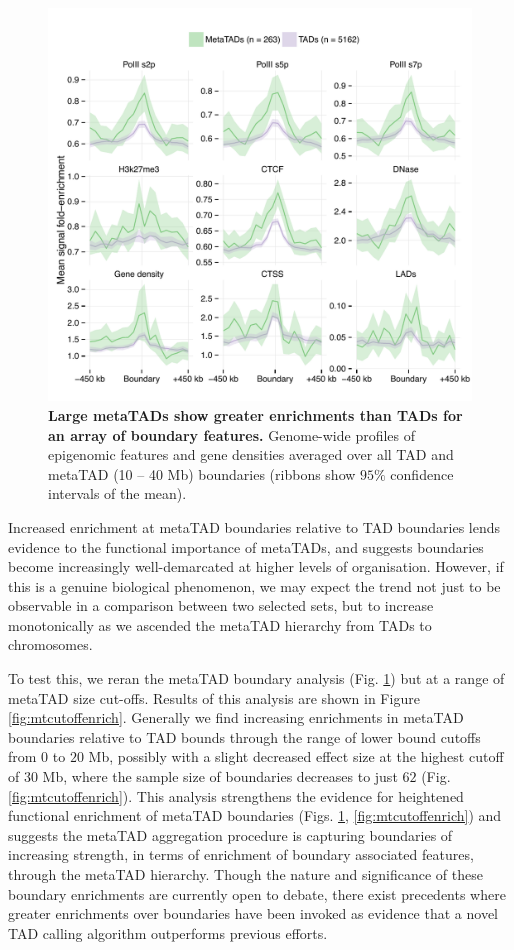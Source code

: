 \documentclass[a4paper,11pt,oneside]{book}
\begin{document}
\begin{figure}
\begin{center} 
\includegraphics[width=4.5in]{figs/mt_feats.pdf}
\captionsetup{width=\textwidth}
\caption[Large metaTADs show greater enrichments than TADs for an array of boundary features.]{ {\bf Large metaTADs show greater enrichments than TADs for an array of boundary features.}
Genome-wide profiles of epigenomic features and gene densities averaged over all TAD and metaTAD (10 -- 40 Mb) boundaries (ribbons show $95\%$ confidence intervals of the mean).
}\label{fig:mtfeats}
\end{center}
\end{figure} 

Increased enrichment at metaTAD boundaries relative to TAD boundaries lends evidence to the functional importance of metaTADs, and suggests boundaries become increasingly well-demarcated at higher levels of organisation. However, if this is a genuine biological phenomenon, we may expect the trend not just to be observable in a comparison between two selected sets, but to increase monotonically as we ascended the metaTAD hierarchy from TADs to chromosomes.

To test this, we reran the metaTAD boundary analysis (Fig. \ref{fig:mtfeats}) but at a range of metaTAD size cut-offs. Results of this analysis are shown in Figure \ref{fig:mtcutoffenrich}. Generally we find increasing enrichments in metaTAD boundaries relative to TAD bounds through the range of lower bound cutoffs from $0$ to $20$ Mb, possibly with a slight decreased effect size at the highest cutoff of $30$ Mb, where the sample size of boundaries decreases to just $62$ (Fig. \ref{fig:mtcutoffenrich}). This analysis strengthens the evidence for heightened functional enrichment of metaTAD boundaries (Figs. \ref{fig:mtfeats}, \ref{fig:mtcutoffenrich}) and suggests the metaTAD aggregation procedure is capturing boundaries of increasing strength, in terms of enrichment of boundary associated features, through the metaTAD hierarchy. Though the nature and significance of these boundary enrichments are currently open to debate, there exist precedents where greater enrichments over boundaries have been invoked as evidence that a novel TAD calling algorithm outperforms previous efforts.\cite{Filippova2014, Weinreb2015}
\end{document}
